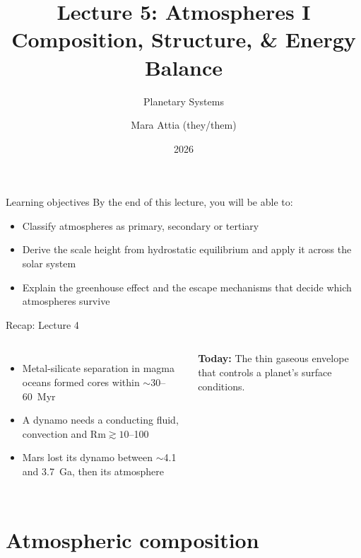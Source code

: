\documentclass[aspectratio=169, 11pt]{beamer}
\title[Lecture 5: Atmospheres I]{Lecture 5: Atmospheres I\\Composition, Structure, \& Energy Balance}
\subtitle{Planetary Systems}
\author[L5]{Mara Attia (they/them)}
\institute{Kapteyn Astronomical Institute\\University of Groningen}
\date{2026}
\begin{document}
\begin{frame}
  \titlepage
\end{frame}

\begin{frame}{Learning objectives}
  By the end of this lecture, you will be able to:
  \vskip8pt
  \begin{itemize}
    \item Classify atmospheres as primary, secondary or tertiary
    \item Derive the scale height from hydrostatic equilibrium and apply it across the solar system
    \item Explain the greenhouse effect and the escape mechanisms that decide which atmospheres survive
  \end{itemize}
\end{frame}

\begin{frame}{Recap: Lecture 4}
  \begin{columns}[c]
    \column{\recapfigcol}

    \column{\recaptextcol}
    \begin{itemize}
      \item Metal-silicate separation in magma oceans formed cores within $\sim$30--60~Myr
      \item A dynamo needs a conducting fluid, convection and $\mathrm{Rm} \gtrsim 10$--100
      \item Mars lost its dynamo between $\sim$4.1 and 3.7~Ga, then its atmosphere
    \end{itemize}
    \vskip8pt
    \textbf{Today:} The thin gaseous envelope that controls a planet's surface conditions.
  \end{columns}
\end{frame}


\section{Atmospheric composition}
\end{document}
